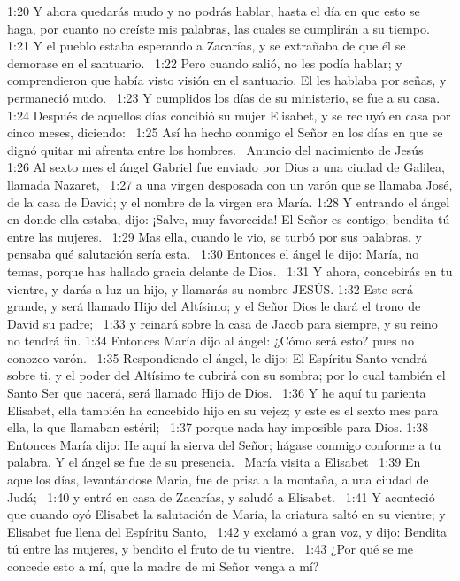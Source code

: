1:20 Y ahora quedarás mudo y no podrás hablar, hasta el día en que esto se haga, por cuanto no creíste mis palabras, las cuales se cumplirán a su tiempo.  
1:21 Y el pueblo estaba esperando a Zacarías, y se extrañaba de que él se demorase en el santuario.  
1:22 Pero cuando salió, no les podía hablar; y comprendieron que había visto visión en el santuario. El les hablaba por señas, y permaneció mudo.  
1:23 Y cumplidos los días de su ministerio, se fue a su casa.  
1:24 Después de aquellos días concibió su mujer Elisabet, y se recluyó en casa por cinco meses, diciendo:  
1:25 Así ha hecho conmigo el Señor en los días en que se dignó quitar mi afrenta entre los hombres.  
Anuncio del nacimiento de Jesús  
1:26 Al sexto mes el ángel Gabriel fue enviado por Dios a una ciudad de Galilea, llamada Nazaret,  
1:27 a una virgen desposada con un varón que se llamaba José, de la casa de David; y el nombre de la virgen era María. 
1:28 Y entrando el ángel en donde ella estaba, dijo: ¡Salve, muy favorecida! El Señor es contigo; bendita tú entre las mujeres.  
1:29 Mas ella, cuando le vio, se turbó por sus palabras, y pensaba qué salutación sería esta.  
1:30 Entonces el ángel le dijo: María, no temas, porque has hallado gracia delante de Dios.  
1:31 Y ahora, concebirás en tu vientre, y darás a luz un hijo, y llamarás su nombre JESÚS. 
1:32 Este será grande, y será llamado Hijo del Altísimo; y el Señor Dios le dará el trono de David su padre;  
1:33 y reinará sobre la casa de Jacob para siempre, y su reino no tendrá fin. 
1:34 Entonces María dijo al ángel: ¿Cómo será esto? pues no conozco varón.  
1:35 Respondiendo el ángel, le dijo: El Espíritu Santo vendrá sobre ti, y el poder del Altísimo te cubrirá con su sombra; por lo cual también el Santo Ser que nacerá, será llamado Hijo de Dios.  
1:36 Y he aquí tu parienta Elisabet, ella también ha concebido hijo en su vejez; y este es el sexto mes para ella, la que llamaban estéril;  
1:37 porque nada hay imposible para Dios. 
1:38 Entonces María dijo: He aquí la sierva del Señor; hágase conmigo conforme a tu palabra. Y el ángel se fue de su presencia.  
María visita a Elisabet  
1:39 En aquellos días, levantándose María, fue de prisa a la montaña, a una ciudad de Judá;  
1:40 y entró en casa de Zacarías, y saludó a Elisabet.  
1:41 Y aconteció que cuando oyó Elisabet la salutación de María, la criatura saltó en su vientre; y Elisabet fue llena del Espíritu Santo,  
1:42 y exclamó a gran voz, y dijo: Bendita tú entre las mujeres, y bendito el fruto de tu vientre.  
1:43 ¿Por qué se me concede esto a mí, que la madre de mi Señor venga a mí?  
